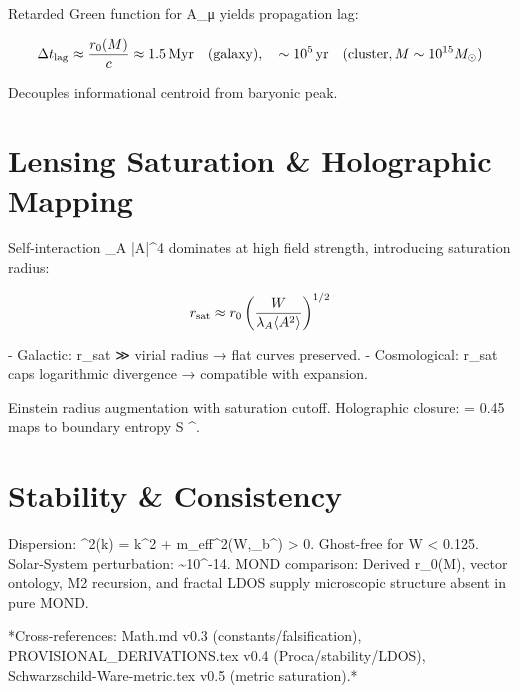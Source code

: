 \documentclass[12pt,a4paper]{article}
\begin{document}
Retarded Green function for A_μ yields propagation lag:

\begin{equation}
\Delta t_{\rm lag} \approx \frac{r_0(M)}{c} \approx 1.5\,\si{Myr} \quad (\text{galaxy}), \quad 
\sim 10^5\,\si{yr} \quad (\text{cluster}, M \sim 10^{15} M_\odot)
\end{equation}

Decouples informational centroid from baryonic peak.

\section{Lensing Saturation \& Holographic Mapping}

Self-interaction \lambda_A |A|^4 dominates at high field strength, introducing saturation radius:

\begin{equation}
r_{\rm sat} \approx r_0 \left( \frac{W}{\lambda_A \langle A^2 \rangle} \right)^{1/2}
\end{equation}

- Galactic: r_sat ≫ virial radius → flat curves preserved.  
- Cosmological: r_sat caps logarithmic divergence → compatible with expansion.  

Einstein radius augmentation with saturation cutoff. Holographic closure: \alpha = 0.45 maps to boundary entropy S \propto {}^\alpha.

\section{Stability \& Consistency}

Dispersion: \omega^2(k) = k^2 + m_{\rm eff}^2(W,\rho_b^\alpha) > 0. Ghost-free for W < 0.125.  
Solar-System perturbation: \eta \sim 10^{-14}.  
MOND comparison: Derived r_0(M), vector ontology, M2 recursion, and fractal LDOS supply microscopic structure absent in pure MOND.

*Cross-references: Math.md v0.3 (constants/falsification), PROVISIONAL_DERIVATIONS.tex v0.4 (Proca/stability/LDOS), Schwarzschild-Ware-metric.tex v0.5 (metric saturation).*
\end{document}
